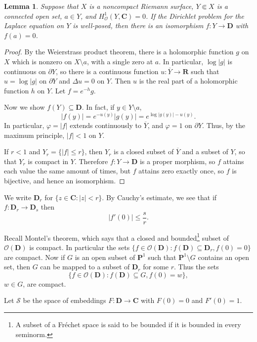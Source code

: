 \documentclass[reqno,12pt,letterpaper]{amsart}
\newcommand{\RR}{\mathbf{R}}
\newcommand{\CC}{\mathbf{C}}
\newcommand{\DD}{\mathbf{D}}
\newcommand{\PP}{\mathbf P}
\newcommand{\Olo}{\mathscr O}
\newtheorem{lemma}[theorem]{Lemma}
\theoremstyle{definition}
\begin{document}
\begin{lemma}
\label{easy Riemann mapping theorem}
Suppose that $X$ is a noncompact Riemann surface, $Y \Subset X$ is a connected open set, $a \in Y$, and $H^1_\Olo(Y, \CC) = 0$.
If the Dirichlet problem for the Laplace equation on $Y$ is well-posed, then there is an isomorphism $f: Y \to \DD$ with $f(a) = 0$.
\end{lemma}
\begin{proof}
By the Weierstrass product theorem, there is a holomorphic function $g$ on $X$ which is nonzero on $X \setminus a$, with a single zero at $a$.
In particular, $\log |g|$ is continuous on $\partial Y$, so there is a continuous function $u: \overline Y \to \RR$ such that $u = \log |g|$ on $\partial Y$ and $\Delta u = 0$ on $Y$.
Then $u$ is the real part of a holomorphic function $h$ on $Y$.
Let $f = e^{-h}g$.

Now we show $f(Y) \subseteq \DD$.
In fact, if $y \in Y \setminus a$,
$$|f(y)| = e^{-u(y)} |g(y)| = e^{\log|g(y)| - u(y)}.$$
In particular, $\varphi = |f|$ extends continuously to $\overline Y$, and $\varphi = 1$ on $\partial Y$.
Thus, by the maximum principle, $|f| < 1$ on $Y$.

If $r < 1$ and $Y_r = \{|f| \leq r\}$, then $Y_r$ is a closed subset of $\overline Y$ and a subset of $Y$, so that $Y_r$ is compact in $Y$.
Therefore $f: Y \to \DD$ is a proper morphism, so $f$ attains each value the same amount of times, but $f$ attains zero exactly once, so $f$ is bijective, and hence an isomorphism.
\end{proof}

We write $\DD_r$ for $\{z \in \CC: |z| < r\}$.
By Cauchy's estimate, we see that if $f: \DD_r \to \DD_s$ then
$$|f'(0)| \leq \frac{s}{r}.$$

Recall Montel's theorem, which says that a closed and bounded\footnote{A subset of a Fr\'echet space is said to be bounded if it is bounded in every seminorm.} subset of $\Olo(\DD)$ is compact.
In particular the sets $\{f \in \Olo(\DD): f(\DD) \subseteq \DD_r, f(0) = 0\}$ are compact.
Now if $G$ is an open subset of $\PP^1$ such that $\PP^1 \setminus G$ contains an open set, then $G$ can be mapped to a subset of $\DD_r$ for some $r$. Thus the sets
$$\{f \in \Olo(\DD): f(\DD) \subseteq G, f(0) = w\},$$
$w \in G$, are compact.

Let $\mathscr S$ be the space of embeddings $F: \DD \to \CC$ with $F(0) = 0$ and $F'(0) = 1$.
\end{document}
